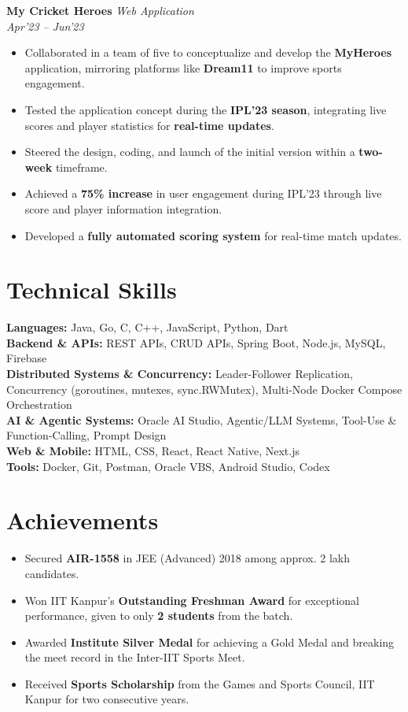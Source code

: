 \documentclass[10pt,a4paper]{article}
\newcommand{\resumeItem}[1]{\item[\textcolor{primary}{\textbullet}] #1}
\newcommand{\skillCategory}[2]{\textbf{#1:} #2}
\begin{document}
\vspace{2pt}
\textbf{My Cricket Heroes} \hfill \textit{Web Application}\\
\textit{Apr'23 -- Jun'23}
\begin{itemize}[leftmargin=1.05em, nosep, topsep=2pt, itemsep=2pt, parsep=0pt]
    \resumeItem{Collaborated in a team of five to conceptualize and develop the \textbf{MyHeroes} application, mirroring platforms like \textbf{Dream11} to improve sports engagement.}
    \resumeItem{Tested the application concept during the \textbf{IPL'23 season}, integrating live scores and player statistics for \textbf{real-time updates}.}
    \resumeItem{Steered the design, coding, and launch of the initial version within a \textbf{two-week} timeframe.}
    \resumeItem{Achieved a \textbf{75\% increase} in user engagement during IPL'23 through live score and player information integration.}
    \resumeItem{Developed a \textbf{fully automated scoring system} for real-time match updates.}
\end{itemize}

\section{Technical Skills}
\small
\skillCategory{Languages}{Java, Go, C, C++, JavaScript, Python, Dart}\\[1pt]
\skillCategory{Backend \& APIs}{REST APIs, CRUD APIs, Spring Boot, Node.js, MySQL, Firebase}\\[1pt]
\skillCategory{Distributed Systems \& Concurrency}{Leader-Follower Replication, Concurrency (goroutines, mutexes, sync.RWMutex), Multi-Node Docker Compose Orchestration}\\[1pt]
\skillCategory{AI \& Agentic Systems}{Oracle AI Studio, Agentic/LLM Systems, Tool-Use \& Function-Calling, Prompt Design}\\[1pt]
\skillCategory{Web \& Mobile}{HTML, CSS, React, React Native, Next.js}\\[1pt]
\skillCategory{Tools}{Docker, Git, Postman, Oracle VBS, Android Studio, Codex}

\section{Achievements}
\small
\begin{itemize}[leftmargin=1.05em, nosep, topsep=2pt, itemsep=2pt, parsep=0pt]
    \resumeItem{Secured \textbf{AIR-1558} in JEE (Advanced) 2018 among approx. 2 lakh candidates.}
    \resumeItem{Won IIT Kanpur's \textbf{Outstanding Freshman Award} for exceptional performance, given to only \textbf{2 students} from the batch.}
    \resumeItem{Awarded \textbf{Institute Silver Medal} for achieving a Gold Medal and breaking the meet record in the Inter-IIT Sports Meet.}
    \resumeItem{Received \textbf{Sports Scholarship} from the Games and Sports Council, IIT Kanpur for two consecutive years.}
\end{itemize}
\end{document}

